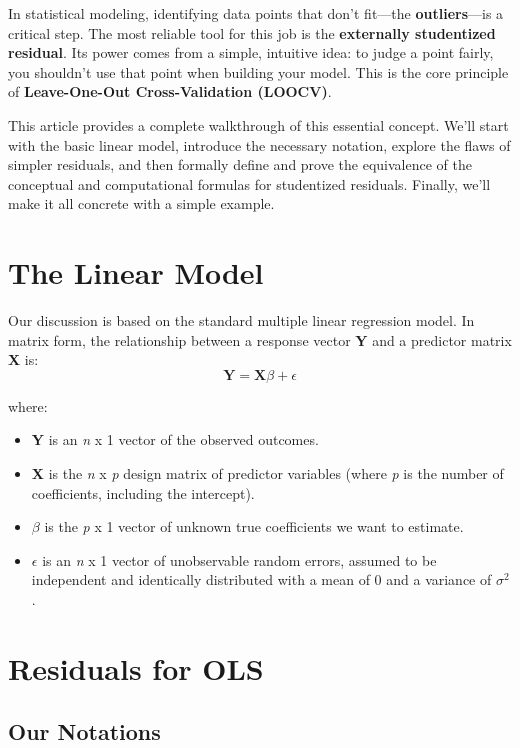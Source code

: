 \documentclass[
  letterpaper,
  DIV=11,
  numbers=noendperiod]{scrreprt}
\providecommand{\tightlist}{%
  \setlength{\itemsep}{0pt}\setlength{\parskip}{0pt}}\usepackage{longtable,booktabs,array}
\begin{document}
In statistical modeling, identifying data points that don't fit---the
\textbf{outliers}---is a critical step. The most reliable tool for this
job is the \textbf{externally studentized residual}. Its power comes
from a simple, intuitive idea: to judge a point fairly, you shouldn't
use that point when building your model. This is the core principle of
\textbf{Leave-One-Out Cross-Validation (LOOCV)}.

This article provides a complete walkthrough of this essential concept.
We'll start with the basic linear model, introduce the necessary
notation, explore the flaws of simpler residuals, and then formally
define and prove the equivalence of the conceptual and computational
formulas for studentized residuals. Finally, we'll make it all concrete
with a simple example.

\section{The Linear Model}\label{the-linear-model}

Our discussion is based on the standard multiple linear regression
model. In matrix form, the relationship between a response vector
\textbf{Y} and a predictor matrix \textbf{X} is: \[
\mathbf{Y} = \mathbf{X}\beta + \epsilon
\]

where:

\begin{itemize}
\tightlist
\item
  \textbf{Y} is an \emph{n} x 1 vector of the observed outcomes.
\item
  \textbf{X} is the \emph{n} x \emph{p} design matrix of predictor
  variables (where \emph{p} is the number of coefficients, including the
  intercept).
\item
  \(\beta\) is the \emph{p} x 1 vector of unknown true coefficients we
  want to estimate.
\item
  \(\epsilon\) is an \emph{n} x 1 vector of unobservable random errors,
  assumed to be independent and identically distributed with a mean of 0
  and a variance of \(\sigma^2\).
\end{itemize}

\section{Residuals for OLS}\label{residuals-for-ols}

\subsection{Our Notations}\label{our-notations}
\end{document}
